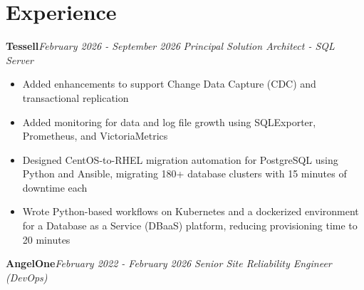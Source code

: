 \documentclass[10pt,a4paper]{article}
\begin{document}
\section{Experience}
\noindent\textbf{Tessell}\hfill \textit{February 2026 - September 2026}
\textit{Principal Solution Architect - SQL Server}\\[-5pt]
\begin{itemize}
  \item Added enhancements to support Change Data Capture (CDC) and transactional replication
  \item Added monitoring for data and log file growth using SQLExporter, Prometheus, and VictoriaMetrics
  \item Designed CentOS-to-RHEL migration automation for PostgreSQL using Python and Ansible, migrating 180+ database clusters with 15 minutes of downtime each
  \item Wrote Python-based workflows on Kubernetes and a dockerized environment for a Database as a Service (DBaaS) platform, reducing provisioning time to 20 minutes
\end{itemize}
\vspace{14.7pt}
\noindent\textbf{AngelOne}\hfill \textit{February 2022 - February 2026}
\textit{Senior Site Reliability Engineer (DevOps)}\\[-5pt]
\end{document}
